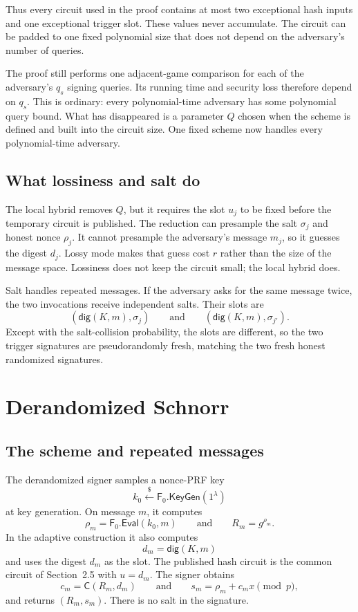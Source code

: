 \documentclass[11pt]{article}
\newcommand{\getsr}{\mathrel{\mathop{\leftarrow}\limits^{\$}}}
\newcommand{\Eval}{\mathsf{Eval}}
\newcommand{\KeyGen}{\mathsf{KeyGen}}
\begin{document}
Thus every circuit used in the proof contains at most two exceptional hash
inputs and one exceptional trigger slot.  These values never accumulate.
The circuit can be padded to one fixed polynomial size that does not depend
on the adversary's number of queries.

The proof still performs one adjacent-game comparison for each of the
adversary's \(q_s\) signing queries.  Its running time and security loss
therefore depend on \(q_s\).  This is ordinary: every polynomial-time
adversary has some polynomial query bound.  What has disappeared is a
parameter \(Q\) chosen when the scheme is defined and built into the circuit
size.  One fixed scheme now handles every polynomial-time adversary.

\subsection{What lossiness and salt do}

The local hybrid removes \(Q\), but it requires the slot \(u_j\) to be fixed
before the temporary circuit is published.  The reduction can presample the
salt \(\sigma_j\) and honest nonce \(\rho_j\).  It cannot presample the
adversary's message \(m_j\), so it guesses the digest \(d_j\).  Lossy mode
makes that guess cost \(r\) rather than the size of the message space.
Lossiness does not keep the circuit small; the local hybrid does.

Salt handles repeated messages.  If the adversary asks for the same message
twice, the two invocations receive independent salts.  Their slots are
\[
  (\mathsf{dig}(K,m),\sigma_j)
  \qquad\text{and}\qquad
  (\mathsf{dig}(K,m),\sigma_{j'}).
\]
Except with the salt-collision probability, the slots are different, so the
two trigger signatures are pseudorandomly fresh, matching the two fresh
honest randomized signatures.

\section{Derandomized Schnorr}

\subsection{The scheme and repeated messages}

The derandomized signer samples a nonce-PRF key
\[
  k_0\getsr\mathsf{F}_0.\KeyGen(1^\lambda)
\]
at key generation.  On message \(m\), it computes
\[
  \rho_m=\mathsf{F}_0.\Eval(k_0,m)
  \qquad\text{and}\qquad
  R_m=g^{\rho_m}.
\]
In the adaptive construction it also computes
\[
  d_m=\mathsf{dig}(K,m)
\]
and uses the digest \(d_m\) as the slot.  The published hash circuit is the
common circuit of Section~2.5 with \(u=d_m\).  The signer obtains
\[
  c_m=\mathsf{C}(R_m,d_m)
  \qquad\text{and}\qquad
  s_m=\rho_m+c_mx\pmod p,
\]
and returns \((R_m,s_m)\).  There is no salt in the signature.
\end{document}
